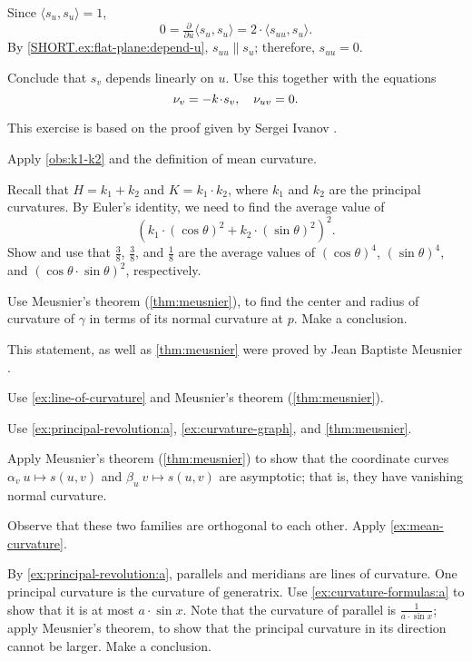 \begin{multicols}{2}
Since $\langle s_u,s_u\rangle=1$,
\[0=\tfrac{\partial}{\partial u}\langle s_u,s_u\rangle=2\cdot\langle s_{uu},s_u\rangle.\]
By \ref{SHORT.ex:flat-plane:depend-u}, $s_{uu}\parallel s_u$; therefore, $s_{uu}=0$.

Conclude that $s_v$ depends linearly on $u$.
Use this together with the equations
\[\Norm_v=-k\cdot s_v,\quad \Norm_{uv}=0.\]

This exercise is based on the proof given by Sergei Ivanov \cite[3$^\text{d}$ Sem. Lect. 13]{ivanov}.

Apply \ref{obs:k1-k2} and the definition of mean curvature.

Recall that $H=k_1+k_2$ and $K=k_1\cdot k_2$, where $k_1$ and $k_2$ are the principal curvatures.
By Euler's identity, we need to find the average value of 
\[(k_1\cdot (\cos\theta)^2+k_2\cdot (\sin\theta)^2)^2.\]
Show and use that $\tfrac38$, $\tfrac38$, and $\tfrac18$ are the average values of $(\cos\theta)^4$, $(\sin\theta)^4$, and $(\cos\theta\cdot \sin\theta)^2$, respectively.


Use Meusnier's theorem (\ref{thm:meusnier}), to find the center and radius of curvature of $\gamma$ in terms of its normal curvature at $p$.
Make a conclusion.

This statement, as well as \ref{thm:meusnier} were proved by Jean Baptiste Meusnier \cite{meusnier}.

Use \ref{ex:line-of-curvature} and Meusnier's theorem (\ref{thm:meusnier}).

Use \ref{ex:principal-revolution:a},  \ref{ex:curvature-graph}, and \ref{thm:meusnier}.

 Apply Meusnier's theorem (\ref{thm:meusnier}) to show that the coordinate curves $\alpha_v\:u\mapsto s(u,v)$ and $\beta_u\:v\mapsto s(u,v)$ are asymptotic; that is, they have vanishing normal curvature.

Observe that these two families are orthogonal to each other.
Apply \ref{ex:mean-curvature}.

By \ref{ex:principal-revolution:a}, parallels and meridians are lines of curvature.
One principal curvature is the curvature of generatrix.
Use \ref{ex:curvature-formulas:a} to show that it is at most $a\cdot \sin x$.
Note that the curvature of parallel is $\tfrac1{a\cdot \sin x}$;
apply Meusnier's theorem, to show that the principal curvature in its direction cannot be larger.
Make a conclusion.


\end{multicols}
